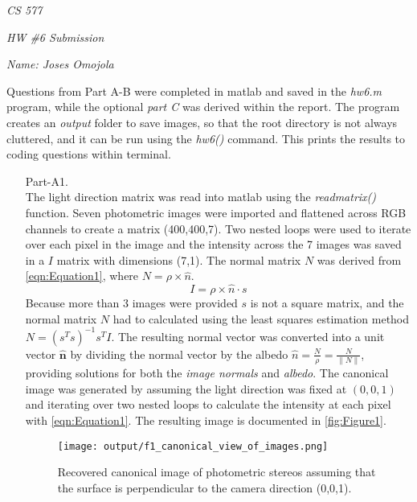 \documentclass[12pt]{report}
\begin{document}
\centerline{\it CS 577}
\centerline{\it HW \#6 Submission}
\centerline{\it Name: Joses Omojola}

Questions from Part A-B were completed in matlab and saved in the \emph{hw6.m} program, while the optional \emph{part C} was derived within the report. The 
program creates an \emph{output} folder to save images, so that the root directory is not always cluttered, and it can be run using the \textit{hw6()} command.
This prints the results to coding questions within terminal.

\begin{enumerate}

    \item[Part-A1.]
    \ \\
    The light direction matrix was read into matlab using the \emph{readmatrix()} function. Seven photometric images were imported and flattened across 
    RGB channels to create a matrix (400,400,7). Two nested loops were used to iterate over each pixel in the image and the intensity across the 7 images 
    was saved in a $I$ matrix with dimensions (7,1). The normal matrix $N$ was derived from \autoref{eqn:Equation1}, where $N=\rho \times \hat{n}$.
    \begin{equation}
    \tag{1}
    I = \rho \times \hat{n} \cdot s
    \label{eqn:Equation1}
    \end{equation}
    Because more than 3 images were provided $s$ is not a square matrix, and the normal matrix $N$ had to calculated using the least squares estimation method 
    $N = (s^T s)^{-1} s^T I$. The resulting normal vector was converted into a unit vector $\mathbf{\hat{n}}$ by dividing the normal vector by the albedo 
    $\hat{n} = \frac{N}{\rho} = \frac{N}{\lVert N \rVert}$, providing solutions for both the \emph{image normals} and \emph{albedo}. The canonical image was 
    generated by assuming the light direction was fixed at $(0,0,1)$ and iterating over two nested loops to calculate the intensity at each pixel with 
    \autoref{eqn:Equation1}. The resulting image is documented in \autoref{fig:Figure1}.

    \begin{figure}[H]
        \centering
        \texttt{[image: output/f1\_canonical\_view\_of\_images.png]}
        \caption{Recovered canonical image of photometric stereos assuming that the surface is perpendicular to the camera direction (0,0,1).}
        \label{fig:Figure1}
    \end{figure}

    \FloatBarrier 


\end{enumerate}
\end{document}
